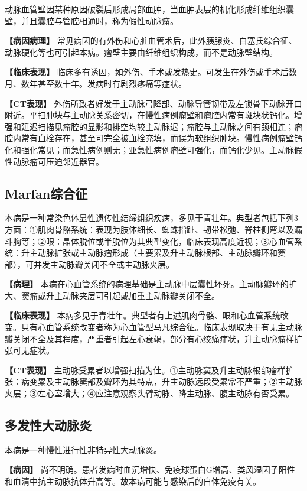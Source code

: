 动脉血管壁因某种原因破裂后形成局部血肿，当血肿表层的机化形成纤维组织囊壁，并且囊腔与管腔相通时，称为假性动脉瘤。

\textbf{【病因病理】}
常见病因的有外伤和心脏血管术后，此外胰腺炎、白塞氏综合征、动脉硬化等也可引起本病。瘤壁主要由纤维组织构成，而不是动脉壁结构。

\textbf{【临床表现】}
临床多有诱因，如外伤、手术或发热史。可发生在外伤或手术后数月、数年甚至数十年。发病时有剧烈疼痛等症状。

\textbf{【CT表现】}
外伤所致者好发于主动脉弓降部、动脉导管韧带及左锁骨下动脉开口附近。平扫肿块与主动脉关系密切，在慢性病例瘤壁和瘤腔内常有斑块状钙化。增强和延迟扫描见瘤腔的显影和排空均较主动脉迟；瘤腔与主动脉之间有颈相连；瘤腔内常有血栓存在，甚至可完全被血栓充填，而误为软组织肿块。慢性病例瘤壁钙化和强化常见；而急性病例则无；亚急性病例瘤壁可强化，而钙化少见。主动脉假性动脉瘤可压迫邻近器官。

\subsection{Marfan综合征}

本病是一种常染色体显性遗传性结缔组织疾病，多见于青壮年。典型者包括下列3方面：①肌肉骨骼系统：表现为肢体细长、蜘蛛指趾、韧带松弛、脊柱侧弯以及漏斗胸等；②眼：晶体脱位或半脱位为其典型变化，临床表现高度近视；③心血管系统：升主动脉扩张或主动脉瘤形成（主要累及升主动脉根部、主动脉瓣环和窦部），可并发主动脉瓣关闭不全或主动脉夹层。

\textbf{【病理】}
本病在心血管系统的病理基础是主动脉中层囊性坏死。主动脉瓣环的扩大、窦瘤或升主动脉夹层可引起或加重主动脉瓣关闭不全。

\textbf{【临床表现】}
本病多见于青壮年。典型者有上述肌肉骨骼、眼和心血管系统改变。只有心血管系统改变者称为心血管型马凡综合征。临床表现取决于有无主动脉瓣关闭不全及其程度，严重者引起左心衰竭，部分有心绞痛症状，升主动脉瘤样扩张可无症状。

\textbf{【CT表现】}
主动脉受累者以增强扫描为佳。①主动脉窦及升主动脉根部瘤样扩张：病变累及主动脉窦部及瓣环为其特点，升主动脉远段受累常不严重；②主动脉夹层；③左心室增大；④应注意观察头臂动脉、降主动脉、腹主动脉有否受累。

\subsection{多发性大动脉炎}

本病是一种慢性进行性非特异性大动脉炎。

\textbf{【病因】}
尚不明确。患者发病时血沉增快、免疫球蛋白G增高、类风湿因子阳性和血清中抗主动脉抗体升高等。故本病可能与感染后的自体免疫有关。


